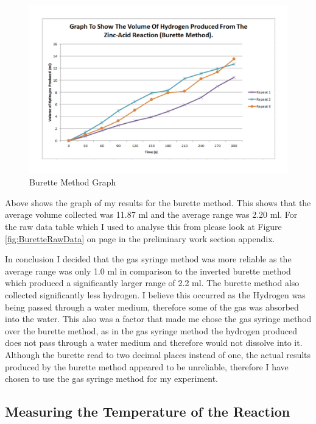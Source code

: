 \begin{figure}[H]
    \includegraphics[width=\textwidth]{./preliminarywork/Graphs/Burette.pdf}
    \caption{Burette Method Graph} \label{fig:Burette Method Results}
\end{figure}

Above shows the graph of my results for the burette method. This shows that the average volume collected was 11.87 ml and the average range was 2.20 ml. For the raw data table which I used to analyse this from please look at Figure \ref{fig:BuretteRawData} on page \pageref{fig:BuretteRawData} in the preliminary work section appendix.



In conclusion I decided that the gas syringe method was more reliable as the average range was only 1.0 ml in comparison to the inverted burette method which produced a significantly larger range of 2.2 ml.  The burette method also collected significantly less hydrogen. I believe this occurred as the Hydrogen was being passed through a water medium, therefore some of the gas was absorbed into the water. This also was a factor that made me chose the gas syringe method over the burette method, as in the gas syringe method the hydrogen produced does not pass through a water medium and therefore would not dissolve into it. Although the burette read to two decimal places instead of one, the actual results produced by the burette method appeared to be unreliable, therefore I have chosen to use the gas syringe method for my experiment.




	\subsection{Measuring the Temperature of the Reaction}


